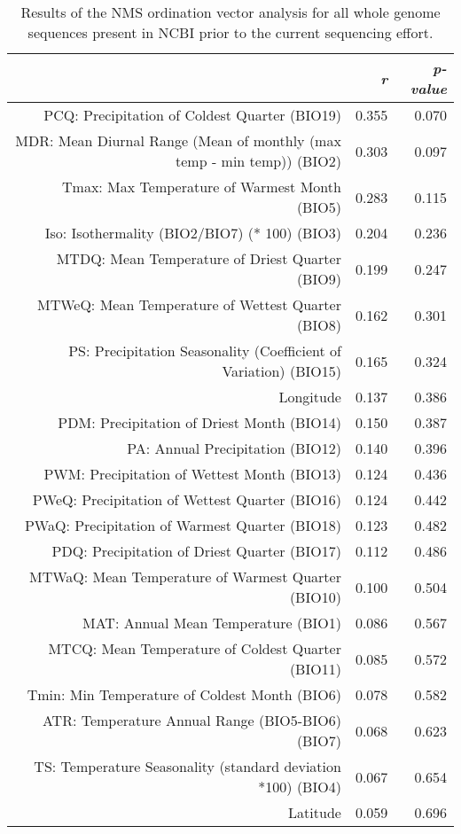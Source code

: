 \begin{table}[ht]
\centering
\begin{tabular}{rrr}
  \hline
 & {\emph{r}} & {\emph{p-value}} \\ 
  \hline
PCQ: Precipitation of Coldest Quarter (BIO19) & 0.355 & 0.070 \\ 
  MDR: Mean Diurnal Range (Mean of monthly (max temp - min temp)) (BIO2) & 0.303 & 0.097 \\ 
  Tmax: Max Temperature of Warmest Month (BIO5) & 0.283 & 0.115 \\ 
  Iso: Isothermality (BIO2/BIO7) (* 100) (BIO3) & 0.204 & 0.236 \\ 
  MTDQ: Mean Temperature of Driest Quarter (BIO9) & 0.199 & 0.247 \\ 
  MTWeQ: Mean Temperature of Wettest Quarter (BIO8) & 0.162 & 0.301 \\ 
  PS: Precipitation Seasonality (Coefficient of Variation) (BIO15) & 0.165 & 0.324 \\ 
  Longitude & 0.137 & 0.386 \\ 
  PDM: Precipitation of Driest Month (BIO14) & 0.150 & 0.387 \\ 
  PA: Annual Precipitation (BIO12) & 0.140 & 0.396 \\ 
  PWM: Precipitation of Wettest Month (BIO13) & 0.124 & 0.436 \\ 
  PWeQ: Precipitation of Wettest Quarter (BIO16) & 0.124 & 0.442 \\ 
  PWaQ: Precipitation of Warmest Quarter (BIO18) & 0.123 & 0.482 \\ 
  PDQ: Precipitation of Driest Quarter (BIO17) & 0.112 & 0.486 \\ 
  MTWaQ: Mean Temperature of Warmest Quarter (BIO10) & 0.100 & 0.504 \\ 
  MAT: Annual Mean Temperature (BIO1) & 0.086 & 0.567 \\ 
  MTCQ: Mean Temperature of Coldest Quarter (BIO11) & 0.085 & 0.572 \\ 
  Tmin: Min Temperature of Coldest Month (BIO6) & 0.078 & 0.582 \\ 
  ATR: Temperature Annual Range (BIO5-BIO6) (BIO7) & 0.068 & 0.623 \\ 
  TS: Temperature Seasonality (standard deviation *100) (BIO4) & 0.067 & 0.654 \\ 
  Latitude & 0.059 & 0.696 \\ 
   \hline
\end{tabular}
\caption{Results of the NMS ordination vector analysis for all whole genome sequences present in NCBI prior to the current sequencing effort.} 
\label{tab:wc_napg_vec}
\end{table}
